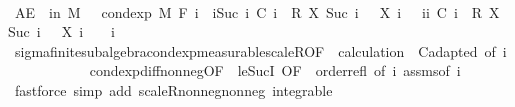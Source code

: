\begin{isabellebody}
\ \ \isamarkupfalse%
\ \isamarkupfalse%
\ {\isachardoublequoteopen}AE\ {\isasymxi}\ in\ M{\isachardot}{\kern0pt}\ {}\ {\isasymle}\ cond{\isacharunderscore}{\kern0pt}exp\ M\ {\isacharparenleft}{\kern0pt}F\ i{\isacharparenright}{\kern0pt}\ {\isacharparenleft}{\kern0pt}{\isasymlambda}{\isasymxi}{\isachardot}{\kern0pt}\ {\isacharparenleft}{\kern0pt}{\isasymSum}i{\isacharless}{\kern0pt}Suc\ i{\isachardot}{\kern0pt}\ C\ i\ {\isasymxi}\ {\isacharasterisk}{\kern0pt}\isactrlsub R\ {\isacharparenleft}{\kern0pt}X\ {\isacharparenleft}{\kern0pt}Suc\ i{\isacharparenright}{\kern0pt}\ {\isasymxi}\ {\isacharminus}{\kern0pt}\ X\ i\ {\isasymxi}{\isacharparenright}{\kern0pt}{\isacharparenright}{\kern0pt}\ {\isacharminus}{\kern0pt}\ {\isacharparenleft}{\kern0pt}{\isasymSum}i{\isacharless}{\kern0pt}i{\isachardot}{\kern0pt}\ C\ i\ {\isasymxi}\ {\isacharasterisk}{\kern0pt}\isactrlsub R\ {\isacharparenleft}{\kern0pt}X\ {\isacharparenleft}{\kern0pt}Suc\ i{\isacharparenright}{\kern0pt}\ {\isasymxi}\ {\isacharminus}{\kern0pt}\ X\ i\ {\isasymxi}{\isacharparenright}{\kern0pt}{\isacharparenright}{\kern0pt}{\isacharparenright}{\kern0pt}\ {\isasymxi}{\isachardoublequoteclose}\ \ i\ \isanewline
\ \ \ \ \isamarkupfalse%
\ sigma{\isacharunderscore}{\kern0pt}finite{\isacharunderscore}{\kern0pt}subalgebra{\isachardot}{\kern0pt}cond{\isacharunderscore}{\kern0pt}exp{\isacharunderscore}{\kern0pt}measurable{\isacharunderscore}{\kern0pt}scaleR{\isacharbrackleft}{\kern0pt}OF\ {\isacharunderscore}{\kern0pt}\ calculation\ {\isacharunderscore}{\kern0pt}\ C{\isachardot}{\kern0pt}adapted{\isacharcomma}{\kern0pt}\ of\ i{\isacharbrackright}{\kern0pt}\ \isanewline
\ \ \ \ \ \ \ \ \ \ cond{\isacharunderscore}{\kern0pt}exp{\isacharunderscore}{\kern0pt}diff{\isacharunderscore}{\kern0pt}nonneg{\isacharbrackleft}{\kern0pt}OF\ {\isacharunderscore}{\kern0pt}\ le{\isacharunderscore}{\kern0pt}SucI{\isacharcomma}{\kern0pt}\ OF\ {\isacharunderscore}{\kern0pt}\ order{\isachardot}{\kern0pt}refl{\isacharcomma}{\kern0pt}\ of\ i{\isacharbrackright}{\kern0pt}\ assms{\isacharparenleft}{\kern0pt}{}{\isacharcomma}{\kern0pt}{}{\isacharparenright}{\kern0pt}{\isacharbrackleft}{\kern0pt}of\ i{\isacharbrackright}{\kern0pt}\ \isamarkupfalse%
\ {\isacharparenleft}{\kern0pt}fastforce\ simp\ add{\isacharcolon}{\kern0pt}\ scaleR{\isacharunderscore}{\kern0pt}nonneg{\isacharunderscore}{\kern0pt}nonneg\ integrable{\isacharparenright}{\kern0pt}\isanewline
\ \ \isamarkupfalse%
\ \isamarkupfalse%

\end{isabellebody}
